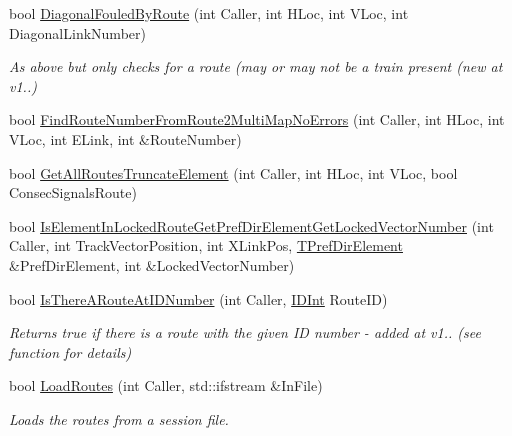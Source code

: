 \begin{DoxyCompactItemize}
\item 
\mbox{\label{class_t_all_routes_ae3fb64509afc46d5871c7843c7769f88}} 
bool \mbox{\hyperlink{class_t_all_routes_ae3fb64509afc46d5871c7843c7769f88}{Diagonal\+Fouled\+By\+Route}} (int Caller, int H\+Loc, int V\+Loc, int Diagonal\+Link\+Number)
\begin{DoxyCompactList}\small\item\em As above but only checks for a route (may or may not be a train present (new at v1..) \end{DoxyCompactList}\item 
bool \mbox{\hyperlink{class_t_all_routes_ac80a3ae43f749d401f470de711e8e4b0}{Find\+Route\+Number\+From\+Route2\+Multi\+Map\+No\+Errors}} (int Caller, int H\+Loc, int V\+Loc, int E\+Link, int \&Route\+Number)
\item 
bool \mbox{\hyperlink{class_t_all_routes_a0f3313fe1870b98a63cbc0deda000d4e}{Get\+All\+Routes\+Truncate\+Element}} (int Caller, int H\+Loc, int V\+Loc, bool Consec\+Signals\+Route)
\item 
bool \mbox{\hyperlink{class_t_all_routes_aa92b37f73176fcf3454688bb15b9f64c}{Is\+Element\+In\+Locked\+Route\+Get\+Pref\+Dir\+Element\+Get\+Locked\+Vector\+Number}} (int Caller, int Track\+Vector\+Position, int X\+Link\+Pos, \mbox{\hyperlink{class_t_pref_dir_element}{T\+Pref\+Dir\+Element}} \&Pref\+Dir\+Element, int \&Locked\+Vector\+Number)
\item 
\mbox{\label{class_t_all_routes_ac0c25f0bd613ff645dab243f1eb8b593}} 
bool \mbox{\hyperlink{class_t_all_routes_ac0c25f0bd613ff645dab243f1eb8b593}{Is\+There\+A\+Route\+At\+I\+D\+Number}} (int Caller, \mbox{\hyperlink{class_i_d_int}{I\+D\+Int}} Route\+ID)
\begin{DoxyCompactList}\small\item\em Returns true if there is a route with the given ID number -\/ added at v1.. (see function for details) \end{DoxyCompactList}\item 
\mbox{\label{class_t_all_routes_adadd08bb4cbbcaeba918f20c6c103a39}} 
bool \mbox{\hyperlink{class_t_all_routes_adadd08bb4cbbcaeba918f20c6c103a39}{Load\+Routes}} (int Caller, std\+::ifstream \&In\+File)
\begin{DoxyCompactList}\small\item\em Loads the routes from a session file. \end{DoxyCompactList}\item 

\end{DoxyCompactItemize}
